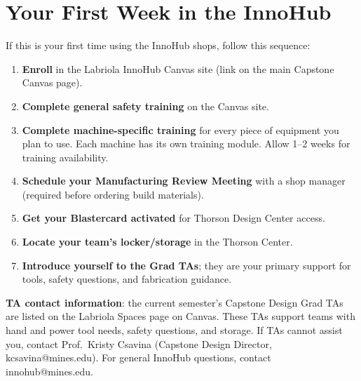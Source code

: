 \section{Your First Week in the InnoHub}
If this is your first time using the InnoHub shops, follow this sequence:

\begin{enumerate}[nosep,leftmargin=1.5em]
\item \textbf{Enroll} in the Labriola InnoHub Canvas site (link on the main Capstone Canvas page).
\item \textbf{Complete general safety training} on the Canvas site.
\item \textbf{Complete machine-specific training} for every piece of equipment you plan to use. Each machine has its own training module. Allow 1--2 weeks for training availability.
\item \textbf{Schedule your Manufacturing Review Meeting} with a shop manager (required before ordering build materials).
\item \textbf{Get your Blastercard activated} for Thorson Design Center access.
\item \textbf{Locate your team's locker/storage} in the Thorson Center.
\item \textbf{Introduce yourself to the Grad TAs}; they are your primary support for tools, safety questions, and fabrication guidance.
\end{enumerate}

\textbf{TA contact information}: the current semester's Capstone Design Grad TAs are listed on the Labriola Spaces page on Canvas. These TAs support teams with hand and power tool needs, safety questions, and storage. If TAs cannot assist you, contact Prof.\ Kristy Csavina (Capstone Design Director, kcsavina@mines.edu). For general InnoHub questions, contact innohub@mines.edu.

